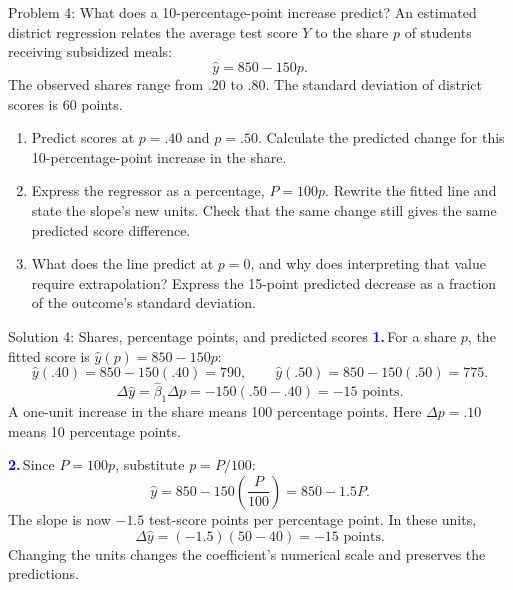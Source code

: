 \documentclass[notes,10pt, aspectratio=169]{beamer}
\newif\ifshowsolutions
\newcommand{\answerpart}[1]{\textcolor{blue}{\textbf{#1.}}\,}
\begin{document}
\begin{frame}{Problem 4: What does a 10-percentage-point increase predict?}
An estimated district regression relates the average test score $Y$ to the share $p$ of students receiving subsidized meals:
\[
\widehat y=850-150p.
\]
The observed shares range from $.20$ to $.80$. The standard deviation of district scores is 60 points.
\begin{enumerate}
\setlength{\itemsep}{8pt}
\item Predict scores at $p=.40$ and $p=.50$. Calculate the predicted change for this 10-percentage-point increase in the share.
\item Express the regressor as a percentage, $P=100p$. Rewrite the fitted line and state the slope's new units. Check that the same change still gives the same predicted score difference.
\item What does the line predict at $p=0$, and why does interpreting that value require extrapolation? Express the 15-point predicted decrease as a fraction of the outcome's standard deviation.
\end{enumerate}
\end{frame}

\ifshowsolutions
\begin{frame}{Solution 4: Shares, percentage points, and predicted scores}
\small
\answerpart{1}For a share $p$, the fitted score is $\widehat y(p)=850-150p$:
\[
\widehat y(.40)=850-150(.40)=790,
\qquad
\widehat y(.50)=850-150(.50)=775.
\]
\[
\Delta\widehat y=\widehat\beta_1\Delta p
=-150(.50-.40)=\boxed{-15\text{ points}}.
\]
A one-unit increase in the share means 100 percentage points. Here $\Delta p=.10$ means 10 percentage points.
\par\vspace{7pt}
\answerpart{2}Since $P=100p$, substitute $p=P/100$:
\[
\widehat y=850-150\left(\frac P{100}\right)=\boxed{850-1.5P}.
\]
The slope is now $-1.5$ test-score points per percentage point. In these units,
\[
\Delta\widehat y=(-1.5)(50-40)=\boxed{-15\text{ points}}.
\]
Changing the units changes the coefficient's numerical scale and preserves the predictions.
\end{frame}
\end{document}
